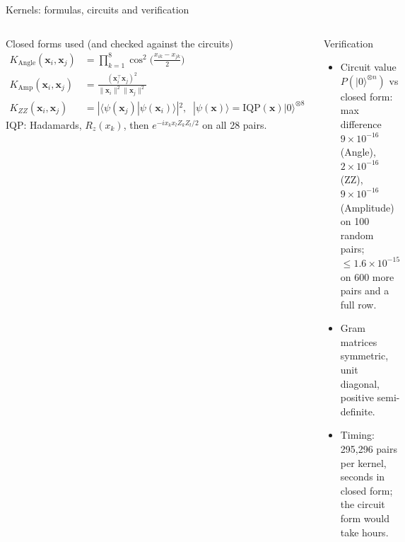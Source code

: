 \documentclass[aspectratio=169,10pt,t,xcolor={table}]{beamer}
\begin{document}
\begin{frame}{Kernels: formulas, circuits and verification}
\begin{columns}[T]
\begin{block}{Closed forms used (and checked against the circuits)}
\footnotesize
\begin{align*}
K_{\mathrm{Angle}}(\mathbf{x}_i,\mathbf{x}_j) &= \prod_{k=1}^{8}\cos^2\!\Big(\tfrac{x_{ik}-x_{jk}}{2}\Big) \\
K_{\mathrm{Amp}}(\mathbf{x}_i,\mathbf{x}_j) &= \frac{(\mathbf{x}_i^{\top}\mathbf{x}_j)^2}{\|\mathbf{x}_i\|^2\|\mathbf{x}_j\|^2} \\
K_{ZZ}(\mathbf{x}_i,\mathbf{x}_j) &= |\langle\psi(\mathbf{x}_j)|\psi(\mathbf{x}_i)\rangle|^2,\;\; |\psi(\mathbf{x})\rangle=\mathrm{IQP}(\mathbf{x})|0\rangle^{\otimes 8}
\end{align*}
IQP: Hadamards, $R_z(x_k)$, then $e^{-i x_k x_l Z_kZ_l/2}$ on all 28 pairs.
\end{block}
\begin{exampleblock}{Verification}
\begin{itemize}\footnotesize
  \item Circuit value $P(|0\rangle^{\otimes n})$ vs closed form: max difference $9\times10^{-16}$ (Angle), $2\times10^{-16}$ (ZZ), $9\times10^{-16}$ (Amplitude) on 100 random pairs; $\le 1.6\times10^{-15}$ on 600 more pairs and a full row.
  \item Gram matrices symmetric, unit diagonal, positive semi-definite.
  \item Timing: 295,296 pairs per kernel, seconds in closed form; the circuit form would take hours.
\end{itemize}
\end{exampleblock}
\end{columns}
\end{frame}
\end{document}
